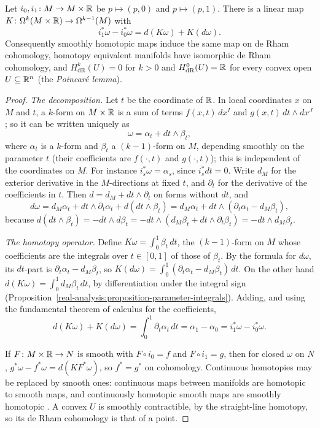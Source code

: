 \begin{theorem}\label{de-rham:theorem-homotopy-invariance}
Let $i_0, i_1 \colon M \to M \times \mathbb{R}$ be $p \mapsto (p, 0)$ and $p \mapsto (p, 1)$. There is a linear map $K \colon \Omega^k(M \times \mathbb{R}) \to \Omega^{k-1}(M)$ with
\[
i_1^*\omega - i_0^*\omega = d(K\omega) + K(d\omega).
\]
Consequently smoothly homotopic maps induce the same map on de Rham cohomology, homotopy equivalent manifolds have isomorphic de Rham cohomology, and $H^k_{\mathrm{dR}}(U) = 0$ for $k > 0$ and
$H^0_{\mathrm{dR}}(U) = \mathbb{R}$ for every convex open $U \subseteq \mathbb{R}^n$ (the \emph{Poincar\'e lemma}).
\end{theorem}

\begin{proof}
\emph{The decomposition.} Let $t$ be the coordinate of $\mathbb{R}$. In local coordinates $x$ on $M$ and $t$, a $k$-form on $M \times \mathbb{R}$ is a sum of terms $f(x, t)\,dx^I$ and
$g(x, t)\,dt \wedge dx^J$; so it can be written uniquely as
\[
\omega = \alpha_t + dt \wedge \beta_t,
\]
where $\alpha_t$ is a $k$-form and $\beta_t$ a $(k-1)$-form on $M$, depending smoothly on the parameter $t$ (their coefficients are $f(\cdot, t)$ and $g(\cdot, t)$); this is
independent of the coordinates on $M$. For instance $i_s^*\omega = \alpha_s$, since $i_s^*dt = 0$. Write $d_M$ for the exterior derivative in the $M$-directions at fixed $t$, and
$\partial_t$ for the derivative of the coefficients in $t$. Then $d = d_M + dt \wedge \partial_t$ on forms without $dt$, and
\[
d\omega = d_M\alpha_t + dt \wedge \partial_t\alpha_t + d(dt \wedge \beta_t) = d_M\alpha_t + dt \wedge (\partial_t\alpha_t - d_M\beta_t),
\]
because $d(dt \wedge \beta_t) = -dt \wedge d\beta_t = -dt \wedge (d_M\beta_t + dt \wedge \partial_t\beta_t) = -dt \wedge d_M\beta_t$.

\emph{The homotopy operator.} Define $K\omega = \int_0^1\beta_t\,dt$, the $(k-1)$-form on $M$ whose coefficients are the integrals over $t \in [0, 1]$ of those of $\beta_t$. By the
formula for $d\omega$, its $dt$-part is $\partial_t\alpha_t - d_M\beta_t$, so $K(d\omega) = \int_0^1(\partial_t\alpha_t - d_M\beta_t)\,dt$. On the other hand
$d(K\omega) = \int_0^1d_M\beta_t\,dt$, by differentiation under the integral sign (Proposition~\ref{real-analysis:proposition-parameter-integrals}). Adding, and using the fundamental
theorem of calculus for the coefficients,
\[
d(K\omega) + K(d\omega) = \int_0^1\partial_t\alpha_t\,dt = \alpha_1 - \alpha_0 = i_1^*\omega - i_0^*\omega .
\]

If $F \colon M \times \mathbb{R} \to N$ is smooth with $F \circ i_0 = f$ and $F \circ i_1 = g$, then for closed $\omega$ on $N$,
$g^*\omega - f^*\omega = d(K F^*\omega)$, so $f^* = g^*$ on cohomology. Continuous homotopies may be replaced by smooth ones: continuous maps between manifolds are homotopic to smooth maps, and continuously
homotopic smooth maps are smoothly homotopic \cite[Chapter 2]{hirsch-differential-topology}. A convex $U$ is smoothly contractible, by the straight-line homotopy, so its de Rham cohomology is that of a
point.
\end{proof}


